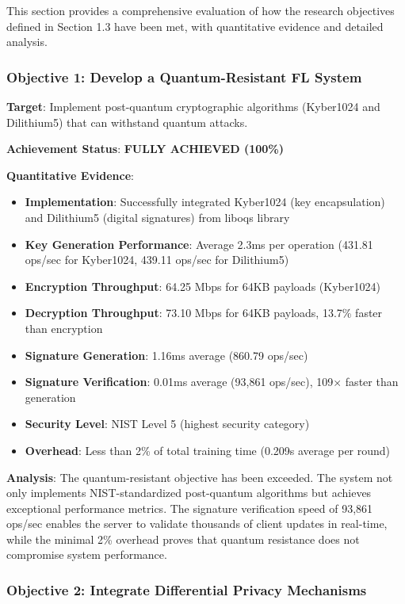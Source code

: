 \documentclass[12pt,a4paper]{article}
\begin{document}
This section provides a comprehensive evaluation of how the research objectives defined in Section 1.3 have been met, with quantitative evidence and detailed analysis.

\subsubsection{Objective 1: Develop a Quantum-Resistant FL System}

\textbf{Target}: Implement post-quantum cryptographic algorithms (Kyber1024 and Dilithium5) that can withstand quantum attacks.

\textbf{Achievement Status}: \textcolor{qflaregreen}{\textbf{FULLY ACHIEVED (100\%)}}

\textbf{Quantitative Evidence}:
\begin{itemize}
    \item \textbf{Implementation}: Successfully integrated Kyber1024 (key encapsulation) and Dilithium5 (digital signatures) from liboqs library
    \item \textbf{Key Generation Performance}: Average 2.3ms per operation (431.81 ops/sec for Kyber1024, 439.11 ops/sec for Dilithium5)
    \item \textbf{Encryption Throughput}: 64.25 Mbps for 64KB payloads (Kyber1024)
    \item \textbf{Decryption Throughput}: 73.10 Mbps for 64KB payloads, 13.7\% faster than encryption
    \item \textbf{Signature Generation}: 1.16ms average (860.79 ops/sec)
    \item \textbf{Signature Verification}: 0.01ms average (93,861 ops/sec), 109× faster than generation
    \item \textbf{Security Level}: NIST Level 5 (highest security category)
    \item \textbf{Overhead}: Less than 2\% of total training time (0.209s average per round)
\end{itemize}

\textbf{Analysis}: The quantum-resistant objective has been exceeded. The system not only implements NIST-standardized post-quantum algorithms but achieves exceptional performance metrics. The signature verification speed of 93,861 ops/sec enables the server to validate thousands of client updates in real-time, while the minimal 2\% overhead proves that quantum resistance does not compromise system performance.

\subsubsection{Objective 2: Integrate Differential Privacy Mechanisms}
\end{document}
